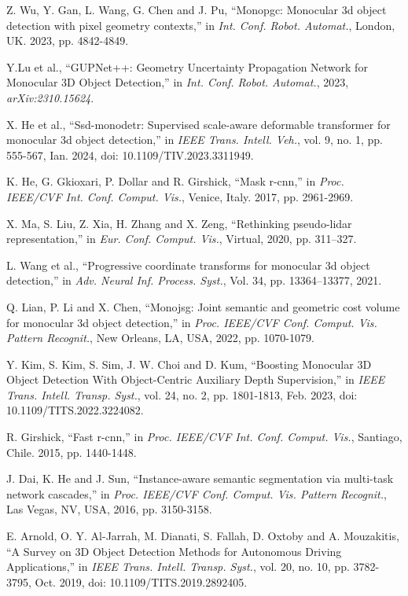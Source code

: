 \documentclass[journal]{IEEEtran}
\begin{document}
\begin{thebibliography}{1}
		Z. Wu, Y. Gan, L. Wang, G. Chen and J. Pu, “Monopgc: Monocular 3d object detection with pixel geometry contexts,” in \textit{Int. Conf. Robot. Automat.}, London, UK. 2023, pp. 4842-4849. 
		
		Y.Lu et al., “GUPNet++: Geometry Uncertainty Propagation Network for Monocular 3D Object Detection,” in \textit{Int. Conf. Robot. Automat.}, 2023, \textit{arXiv:2310.15624}.
		
		X. He et al., “Ssd-monodetr: Supervised scale-aware deformable transformer for monocular 3d object detection,” in \textit{IEEE Trans. Intell. Veh.}, vol. 9, no. 1, pp. 555-567, Ian. 2024, doi: 10.1109/TIV.2023.3311949.
		
		K. He, G. Gkioxari, P. Dollar and R. Girshick, “Mask r-cnn,” in \textit{Proc. IEEE/CVF Int. Conf. Comput. Vis.}, Venice, Italy. 2017, pp. 2961-2969.
		
		X. Ma, S. Liu, Z. Xia, H. Zhang and X. Zeng, “Rethinking pseudo-lidar representation,” in \textit{Eur. Conf. Comput. Vis.}, Virtual, 2020, pp. 311–327.
		
		L. Wang et al., “Progressive coordinate transforms for monocular 3d object detection,” in \textit{Adv. Neural Inf. Process. Syst.}, Vol. 34, pp. 13364--13377, 2021.
		
		Q. Lian, P. Li and X. Chen, “Monojsg: Joint semantic and geometric cost volume for monocular 3d object detection,” in \textit{Proc. IEEE/CVF Conf. Comput. Vis. Pattern Recognit.}, New Orleans, LA, USA, 2022, pp. 1070-1079.
		
		Y. Kim, S. Kim, S. Sim, J. W. Choi and D. Kum, “Boosting Monocular 3D Object Detection With Object-Centric Auxiliary Depth Supervision,” in \textit{IEEE Trans. Intell. Transp. Syst.}, vol. 24, no. 2, pp. 1801-1813, Feb. 2023, doi: 10.1109/TITS.2022.3224082.
		
		R. Girshick, “Fast r-cnn,” in \textit{Proc. IEEE/CVF Int. Conf. Comput. Vis.}, Santiago, Chile. 2015, pp. 1440-1448.
		
		J. Dai, K. He and J. Sun, “Instance-aware semantic segmentation via multi-task network cascades,” in \textit{Proc. IEEE/CVF Conf. Comput. Vis. Pattern Recognit.}, Las Vegas, NV, USA, 2016, pp. 3150-3158.
		
		E. Arnold, O. Y. Al-Jarrah, M. Dianati, S. Fallah, D. Oxtoby and A. Mouzakitis, “A Survey on 3D Object Detection Methods for Autonomous Driving Applications,” in \textit{IEEE Trans. Intell. Transp. Syst.}, vol. 20, no. 10, pp. 3782-3795, Oct. 2019, doi: 10.1109/TITS.2019.2892405.
		

\end{thebibliography}
\end{document}
